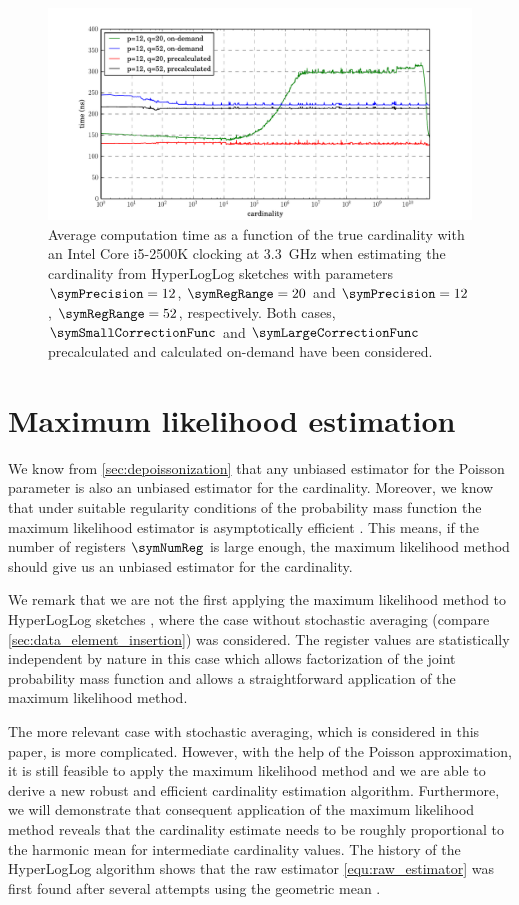 \documentclass[a4paper]{scrartcl}
\begin{document}
\begin{figure}
\centering
\includegraphics[width=1\textwidth]{corrected_raw_avg_exec_time}
\caption{Average computation time as a function of the true cardinality with an Intel Core i5-2500K clocking at \SI{3.3}{\giga\hertz} when estimating the cardinality from HyperLogLog sketches with parameters $\symPrecision=12$, $\symRegRange=20$ and $\symPrecision=12$, $\symRegRange=52$, respectively. Both cases, $\symSmallCorrectionFunc$ and $\symLargeCorrectionFunc$ precalculated and calculated on-demand have been considered.}
\label{fig:corrected_raw_avg_exec_time}
\end{figure}

\section{Maximum likelihood estimation}
We know from \cref{sec:depoissonization} that any unbiased estimator for the Poisson parameter is also an unbiased estimator for the cardinality. Moreover, we know that under suitable regularity conditions of the probability mass function the maximum likelihood estimator is asymptotically efficient \cite{Casella2002}. This means, if the number of registers $\symNumReg$ is large enough, the maximum likelihood method should give us an unbiased estimator for the cardinality.

We remark that we are not the first applying the maximum likelihood method to HyperLogLog sketches \cite{Clifford2012}, where the case without stochastic averaging (compare \cref{sec:data_element_insertion}) was considered. The register values are statistically independent by nature in this case which 
allows factorization of the joint probability mass function and allows a straightforward application of the maximum likelihood method. 

The more relevant case with stochastic averaging, which is considered in this paper, is more complicated. However, with the help of the Poisson approximation, it is still feasible to apply the maximum likelihood method and we are able to derive a new robust and efficient cardinality estimation algorithm. Furthermore, we will demonstrate that consequent application of the maximum likelihood method reveals that the cardinality estimate needs to be roughly proportional to the harmonic mean for intermediate cardinality values. The history of the HyperLogLog algorithm shows that the raw estimator \eqref{equ:raw_estimator} was first found after several attempts using the geometric mean \cite{Flajolet2007, Durand2003}.
\end{document}
